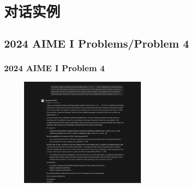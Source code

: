 \section{对话实例}


\subsection{2024 AIME I Problems/Problem 4}

\begin{frame}
    \frametitle{2024 AIME I Problem 4}
    \begin{figure}
        \centering
        \includegraphics[width=0.55\textwidth]{./pic/2.png} %
        \label{fig:aime_problem_1}
    \end{figure}
\end{frame}

